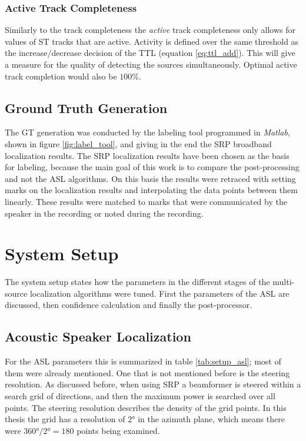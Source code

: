\subsubsection{Active Track Completeness}
Similarly to the track completeness the \emph{active} track completeness only allows for values of \ac{ST} tracks that are active. Activity is defined over the same threshold as the increase/decrease decision of the \ac{TTL} (equation \ref{eq:ttl_add}). This will give a measure for the quality of detecting the sources simultaneously. Optimal active track completion would also be $100\%$.

\subsection{Ground Truth Generation}
\label{subsec:GT}
The \ac{GT} generation was conducted by the labeling tool programmed in \emph{Matlab}, shown in figure \ref{fig:label_tool}, and giving in the end the SRP broadband localization results. The SRP localization results have been chosen as the basis for labeling, because the main goal of this work is to compare the post-processing and not the \ac{ASL} algorithms. On this basis the results were retraced with setting marks on the localization results and interpolating the data points between them linearly. These results were matched to marks that were communicated by the speaker in the recording or noted during the recording.

\section{System Setup}
\label{sec:system_setup}
The system setup states how the parameters in the different stages of the multi-source localization algorithms were tuned. First the parameters of the \ac{ASL} are discussed, then confidence calculation and finally the post-processor.
\subsection{Acoustic Speaker Localization}
For the \ac{ASL} parameters this is summarized in table \ref{tab:setup_asl}; most of them were already mentioned. One that is not mentioned before is the steering resolution. As discussed before, when using \ac{SRP} a beamformer is steered within a search grid of directions, and then the maximum power is searched over all points. The steering resolution describes the density of the grid points. In this thesis the grid has a resolution of $\ang{2}$ in the azimuth plane, which means there were $\ang{360}/\ang{2} = 180$ points being examined.

